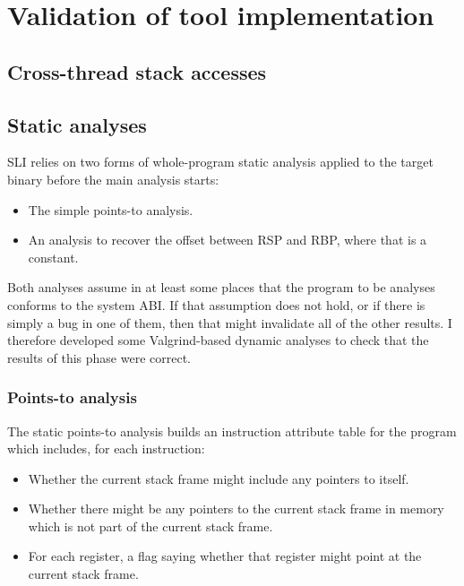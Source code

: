 \section{Validation of tool implementation}

\subsection{Cross-thread stack accesses}

\subsection{Static analyses}

SLI relies on two forms of whole-program static analysis applied to the target binary before the main analysis starts:

\begin{itemize}
\item
  The simple points-to analysis.
\item
  An analysis to recover the offset between RSP and RBP, where that is a constant.
\end{itemize}

Both analyses assume in at least some places that the program to be analyses conforms to the system ABI.
If that assumption does not hold, or if there is simply a bug in one of them, then that might invalidate all of the other results.
I therefore developed some Valgrind-based dynamic analyses to check that the results of this phase were correct.


\subsubsection{Points-to analysis}
\label{sect:eval:validate:pta}

The static points-to analysis builds an instruction attribute table
for the program which includes, for each instruction:

\begin{itemize}
\item
  Whether the current stack frame might include any pointers to itself.
\item
  Whether there might be any pointers to the current stack frame in memory which is not part of the current stack frame.
\item
  For each register, a flag saying whether that register might point at the current stack frame.
\end{itemize}

